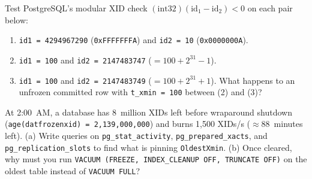 \begin{exercise}
Test PostgreSQL's modular XID check $(\text{int32})(\mathrm{id}_1 - \mathrm{id}_2) < 0$ on each pair below:
\begin{enumerate}
  \item \texttt{id1 = 4294967290} (\texttt{0xFFFFFFFA}) and \texttt{id2 = 10} (\texttt{0x0000000A}).
  \item \texttt{id1 = 100} and \texttt{id2 = 2147483747} ($= 100 + 2^{31} - 1$).
  \item \texttt{id1 = 100} and \texttt{id2 = 2147483749} ($= 100 + 2^{31} + 1$). What happens to an unfrozen committed row with \texttt{t\_xmin = 100} between (2) and (3)?
\end{enumerate}
\end{exercise}

\begin{exercise}
At 2:00~AM, a database has 8~million XIDs left before wraparound shutdown (\texttt{age(datfrozenxid) = 2,139,000,000}) and burns 1,500 XIDs/s ($\approx 88$~minutes left).
(a) Write queries on \texttt{pg\_stat\_activity}, \texttt{pg\_prepared\_xacts}, and \texttt{pg\_replication\_slots} to find what is pinning \texttt{OldestXmin}.
(b) Once cleared, why must you run \texttt{VACUUM (FREEZE, INDEX\_CLEANUP OFF, TRUNCATE OFF)} on the oldest table instead of \texttt{VACUUM FULL}?
\end{exercise}
